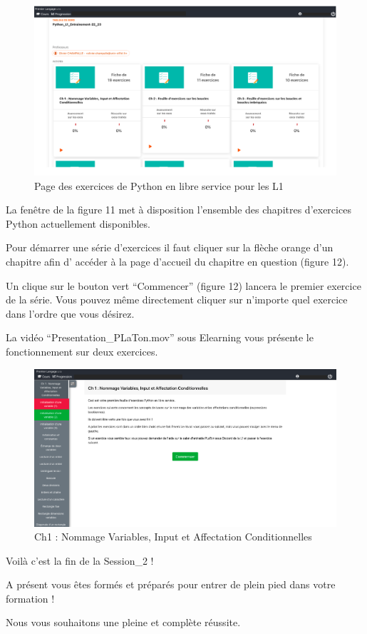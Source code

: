 \documentclass{article}
\begin{document}
\begin{figure}[h!]
    \begin{center}
    \includegraphics[scale=0.3]{PLaTon1.png}
    \caption{Page des exercices de Python en libre service pour les L1}
     \end{center}
\end{figure}   

La fenêtre de la figure 11 met à disposition l'ensemble des chapitres d'exercices Python actuellement disponibles. 

Pour démarrer une série d'exercices il faut cliquer sur la flèche orange d'un chapitre afin d' accéder à la page d'accueil du chapitre en question (figure 12). 

Un clique sur le bouton vert ``Commencer'' (figure 12) lancera le premier exercice de la série. Vous pouvez même directement cliquer sur n'importe quel exercice dans l'ordre que vous désirez.

La vidéo ``Presentation\_PLaTon.mov'' sous Elearning vous présente le fonctionnement sur deux exercices.

\begin{figure}[h!]
    \begin{center}
    \includegraphics[scale=0.25]{PLaTon2.png}
    \caption{Ch1 : Nommage Variables, Input et Affectation Conditionnelles}
     \end{center}
\end{figure}   

Voilà c'est la fin de la Session\_2 ! 

A présent vous êtes formés et préparés pour entrer de plein pied dans votre formation ! 

Nous vous souhaitons une pleine et complète réussite.
\end{document}
